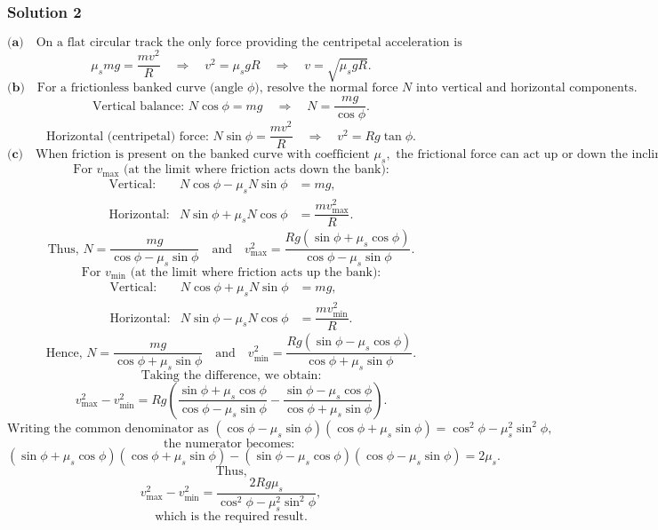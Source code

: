 \documentclass{article}
\begin{document}
\subsubsection{Solution 2}
\[
\textbf{(a)}\quad \text{On a flat circular track the only force providing the centripetal acceleration is static friction. Thus,}
\]
\[
\mu_s mg = \frac{mv^2}{R} \quad \Rightarrow \quad v^2 = \mu_s g R \quad \Rightarrow \quad v = \sqrt{\mu_s g R}.
\]
\[
\textbf{(b)}\quad \text{For a frictionless banked curve (angle } \phi \text{), resolve the normal force } N \text{ into vertical and horizontal components.}
\]
\[
\text{Vertical balance: } N\cos\phi = mg \quad \Rightarrow \quad N = \frac{mg}{\cos\phi}.
\]
\[
\text{Horizontal (centripetal) force: } N\sin\phi = \frac{mv^2}{R} \quad \Rightarrow \quad v^2 = Rg\tan\phi.
\]
\[
\textbf{(c)}\quad \text{When friction is present on the banked curve with coefficient } \mu_s, \text{ the frictional force can act up or down the incline.}
\]
\[
\text{For } v_{\text{max}} \text{ (at the limit where friction acts down the bank):}
\]
\[
\begin{array}{rcl}
\text{Vertical:} & N\cos\phi - \mu_s N\sin\phi &= mg, \\
\text{Horizontal:} & N\sin\phi + \mu_s N\cos\phi &= \dfrac{mv_{\text{max}}^2}{R}.
\end{array}
\]
\[
\text{Thus, } N = \frac{mg}{\cos\phi - \mu_s\sin\phi} \quad \text{and} \quad v_{\text{max}}^2 = \frac{Rg(\sin\phi+\mu_s\cos\phi)}{\cos\phi-\mu_s\sin\phi}.
\]
\[
\text{For } v_{\text{min}} \text{ (at the limit where friction acts up the bank):}
\]
\[
\begin{array}{rcl}
\text{Vertical:} & N\cos\phi + \mu_s N\sin\phi &= mg, \\
\text{Horizontal:} & N\sin\phi - \mu_s N\cos\phi &= \dfrac{mv_{\text{min}}^2}{R}.
\end{array}
\]
\[
\text{Hence, } N = \frac{mg}{\cos\phi + \mu_s\sin\phi} \quad \text{and} \quad v_{\text{min}}^2 = \frac{Rg(\sin\phi-\mu_s\cos\phi)}{\cos\phi+\mu_s\sin\phi}.
\]
\[
\text{Taking the difference, we obtain:}
\]
\[
v_{\text{max}}^2 - v_{\text{min}}^2 = Rg\left(\frac{\sin\phi+\mu_s\cos\phi}{\cos\phi-\mu_s\sin\phi} - \frac{\sin\phi-\mu_s\cos\phi}{\cos\phi+\mu_s\sin\phi}\right).
\]
\[
\text{Writing the common denominator as } (\cos\phi-\mu_s\sin\phi)(\cos\phi+\mu_s\sin\phi)=\cos^2\phi-\mu_s^2\sin^2\phi,
\]
\[
\text{the numerator becomes: }
\]
\[
(\sin\phi+\mu_s\cos\phi)(\cos\phi+\mu_s\sin\phi)-(\sin\phi-\mu_s\cos\phi)(\cos\phi-\mu_s\sin\phi)=2\mu_s.
\]
\[
\text{Thus,}
\]
\[
v_{\text{max}}^2 - v_{\text{min}}^2 = \frac{2Rg\mu_s}{\cos^2\phi-\mu_s^2\sin^2\phi},
\]
\[
\text{which is the required result.}
\]
\end{document}
